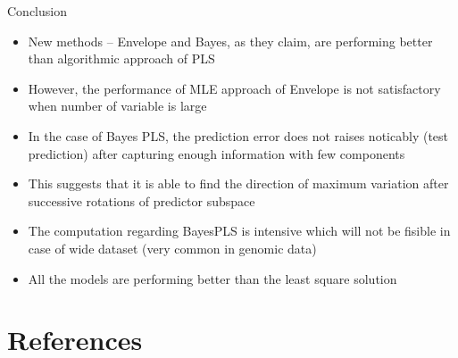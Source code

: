 \documentclass[ignorenonframetext,]{beamer}
\newif\ifbibliography
\providecommand{\tightlist}{%
  \setlength{\itemsep}{0pt}\setlength{\parskip}{0pt}}
\begin{document}
\begin{frame}{Conclusion}

\begin{itemize}
\tightlist
\item
  New methods -- Envelope and Bayes, as they claim, are performing
  better than algorithmic approach of PLS
\item
  However, the performance of MLE approach of Envelope is not
  satisfactory when number of variable is large
\item
  In the case of Bayes PLS, the prediction error does not raises
  noticably (test prediction) after capturing enough information with
  few components
\item
  This suggests that it is able to find the direction of maximum
  variation after successive rotations of predictor subspace
\item
  The computation regarding BayesPLS is intensive which will not be
  fisible in case of wide dataset (very common in genomic data)
\item
  All the models are performing better than the least square solution
\end{itemize}

\end{frame}

\section{References}\label{references}

\begin{frame}[allowframebreaks]{}
\bibliographytrue

\end{frame}
\end{document}
